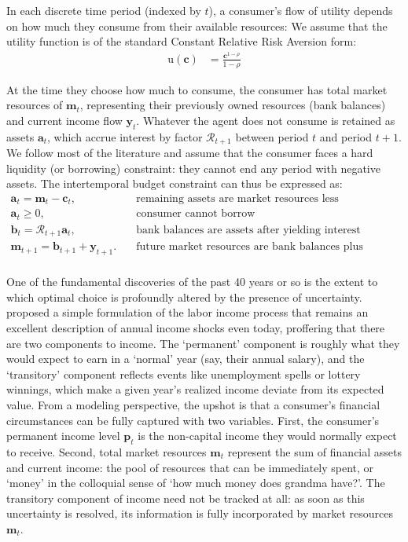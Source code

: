 \documentclass{article}
\newcommand{\CRRA}{\rho}
\newcommand{\uFunc}{\mathrm{u}}
\newcommand{\cLvl}{\mathbf{c}}
\newcommand{\mLvl}{\mathbf{m}}
\newcommand{\yLvl}{\mathbf{y}}
\newcommand{\aLvl}{\mathbf{a}}
\newcommand{\Rport}{\mathcal{R}}
\newcommand{\bLvl}{\mathbf{b}}
\newcommand{\pLvl}{\mathbf{p}}
\begin{document}
In each discrete time period (indexed by $t$), a consumer's flow of utility depends on how much they consume from their available resources:
We assume that the utility function is of the standard Constant Relative Risk Aversion form:
\begin{align}
    \uFunc(\cLvl) & = \frac{\cLvl^{1-\CRRA}}{1-\CRRA}
\end{align}

At the time they choose how much to consume, the consumer has total market resources of $\mLvl_t$, representing their previously owned resources (bank balances) and current income flow $\yLvl_t$.
Whatever the agent does not consume is retained as assets $\aLvl_t$, which accrue interest by factor $\Rport_{t+1}$ between period $t$ and period $t+1$.
We follow most of the literature and assume that the consumer faces a hard liquidity (or borrowing) constraint: they cannot end any period with negative assets.
The intertemporal budget constraint can thus be expressed as:
\begin{align}
    \aLvl_t = \mLvl_t - \cLvl_t, & \text{~~~remaining assets are market resources less consumption} \\
    \aLvl_t \geq 0, & \text{~~~consumer cannot borrow} \\
    \bLvl_t = \Rport_{t+1} \aLvl_t, & \text{~~~bank balances are assets after yielding interest} \\
    \mLvl_{t+1} = \bLvl_{t+1} + \yLvl_{t+1}. & \text{~~~future market resources are bank balances plus income} \\
\end{align}

One of the fundamental discoveries of the past 40 years or so is the extent to which optimal choice is profoundly altered by the presence of uncertainty.
\cite{friedman1957} proposed a simple formulation of the labor income process that remains an excellent description of annual income shocks even today, proffering that there are two components to income.
The `permanent' component is roughly what they would expect to earn in a `normal' year (say, their annual salary), and the `transitory' component reflects events like unemployment spells or lottery winnings, which make a given year's realized income deviate from its expected value.
From a modeling perspective, the upshot is that a consumer's financial circumstances can be fully captured with two variables.
First, the consumer's permanent income level $\pLvl_{t}$ is the non-capital income they would normally expect to receive.
Second, total market resources $\mLvl_{t}$ represent the sum of financial assets and current income: the pool of resources that can be immediately spent, or `money' in the colloquial sense of `how much money does grandma have?'.
The transitory component of income need not be tracked at all: as soon as this uncertainty is resolved, its information is fully incorporated by market resources $\mLvl_{t}$.
\end{document}

